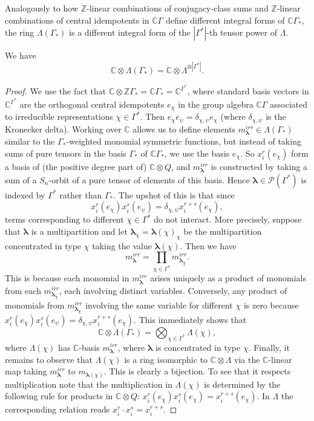 \documentclass[ALCO,Unicode]{cedram}
\newcommand{\bs}{\boldsymbol}
\newcommand{\LambdaG}{\Lambda(\Gamma_*)}
\newcommand{\LambdaG}{\Lambda(\Gamma_*)}
\begin{document}
Analogously to how $\mathbb{Z}$-linear combinations of conjugacy-class sums and $\mathbb{Z}$-linear combinations of central idempotents in $\mathbb{C}\Gamma$ define different integral forms of $\mathbb{C}\Gamma_*$, the ring $\LambdaG$ is a different integral form of the $|\Gamma^*|$-th tensor power of $\Lambda$.
\begin{proposition} \label{complex_bas_change_prop}
We have
\[
\mathbb{C} \otimes \LambdaG = \mathbb{C} \otimes \Lambda^{\otimes |\Gamma^*|}.
\]
\end{proposition}
\begin{proof}
We use the fact that $\mathbb{C} \otimes \mathbb{Z}\Gamma_* = \mathbb{C} \Gamma_* = \mathbb{C}^{\Gamma^*}$, where standard basis vectors in $\mathbb{C}^{\Gamma^*}$ are the orthogonal central idempotents $e_\chi$ in the group algebra $\mathbb{C}\Gamma$ associated to irreducible representations $\chi \in \Gamma^*$. Then $e_\chi e_{\psi} = \delta_{\chi, \psi} e_{\chi}$ (where $\delta_{\chi, \psi}$ is the Kronecker delta). Working over $\mathbb{C}$ allows us to define elements $m_{\bs\lambda}^{irr} \in \LambdaG$ similar to the $\Gamma_*$-weighted monomial symmetric functions, but instead of taking sums of pure tensors in the basis $\Gamma_*$ of $\mathbb{C}\Gamma_*$, we use the basis $e_\chi$. So $x_i^r (e_\chi)$ form a basis of (the positive degree part of) $\mathbb{C} \otimes Q$, and $m_{\bs\lambda}^{irr}$ is constructed by taking a sum of a $S_n$-orbit of a pure tensor of elements of this basis. Hence $\bs\lambda \in \mathcal{P}(\Gamma^*)$ is indexed by $\Gamma^*$ rather than $\Gamma_*$. The upshot of this is that since 
\[
x_i^r(e_\chi) x_i^s( e_\psi) = \delta_{\chi, \psi} x_i^{r+s}(e_\chi),
\]
terms corresponding to different $\chi \in \Gamma^*$ do not interact. More precisely, suppose that $\bs \lambda$ is a multipartition and let ${\bs \lambda}_\chi = {\bs \lambda}(\chi)_{\chi}$ be the multipartition concentrated in type $\chi$ taking the value $\bs \lambda(\chi)$. Then we have
\[
m_{\bs\lambda}^{irr} = \prod_{\chi \in \Gamma^*} m_{{\bs\lambda}_\chi}^{irr}.
\]
This is because each monomial in $m_{\bs\lambda}^{irr}$ arises uniquely as a product of monomials from each $m_{{\bs\lambda}_\chi}^{irr}$, each involving distinct variables. Conversely, any product of monomials from $m_{{\bs\lambda}_\chi}^{irr}$ involving the same variable for different $\chi$ is zero because $x_i^r(e_\chi) x_i^s( e_\psi) = \delta_{\chi, \psi} x_i^{r+s}(e_\chi)$. This immediately shows that
\[
\mathbb{C} \otimes \LambdaG = \bigotimes_{\chi \in \Gamma^*} \Lambda(\chi),
\]
where $\Lambda(\chi)$ has $\mathbb{C}$-basis $m_{\bs \lambda}^{irr}$, where $\bs\lambda$ is concentrated in type $\chi$. Finally, it remains to observe that $\Lambda(\chi)$ is a ring isomorphic to $\mathbb{C} \otimes \Lambda$ via the $\mathbb{C}$-linear map taking $m_{\bs\lambda}^{irr}$ to $m_{\bs\lambda(\chi)}$. This is clearly a bijection. To see that it respects multiplication note that the multiplication in $\Lambda(\chi)$ is determined by the following rule for products in $\mathbb{C} \otimes Q$: $x_i^r(e_\chi) x_i^s( e_\chi) = x_i^{r+s}(e_\chi)$. In $\Lambda$ the corresponding relation reads $x_i^r \cdot x_i^s = x_i^{r+s}$.
\end{proof}
\end{document}

